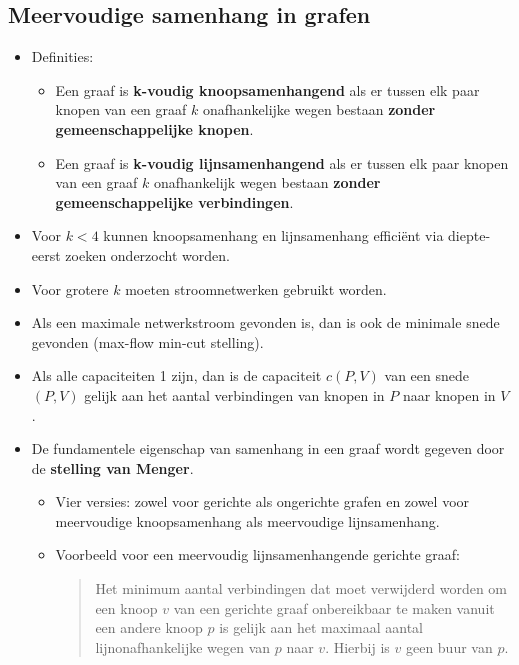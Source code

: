 \subsection{Meervoudige samenhang in grafen}
\begin{itemize}
    \item Definities:
    \begin{itemize}
        \item Een graaf is \textbf{k-voudig knoopsamenhangend} als er tussen elk paar knopen van een graaf $k$ onafhankelijke wegen bestaan \textbf{zonder gemeenschappelijke knopen}.
        \item Een graaf is \textbf{k-voudig lijnsamenhangend} als er tussen elk paar knopen van een graaf $k$ onafhankelijk wegen bestaan \textbf{zonder gemeenschappelijke verbindingen}.
    \end{itemize}
    \item Voor $k < 4$ kunnen knoopsamenhang en lijnsamenhang efficiënt via diepte-eerst zoeken onderzocht worden.
    \item Voor grotere $k$ moeten stroomnetwerken gebruikt worden.
    \item Als een maximale netwerkstroom gevonden is, dan is ook de minimale snede gevonden (max-flow min-cut stelling).
    \item Als alle capaciteiten 1 zijn, dan is de capaciteit $c(P, V)$ van een snede $(P, V)$ gelijk aan het aantal verbindingen van knopen in $P$ naar knopen in $V$.
    \item De fundamentele eigenschap van samenhang in een graaf wordt gegeven door de \textbf{stelling van Menger}.
    \begin{itemize}
        \item Vier versies: zowel voor gerichte als ongerichte grafen en zowel voor meervoudige knoopsamenhang als meervoudige lijnsamenhang.
        \item Voorbeeld voor een meervoudig lijnsamenhangende gerichte graaf:
        
        \begin{quote}
            Het minimum aantal verbindingen dat moet verwijderd worden om een knoop $v$ van een gerichte graaf onbereikbaar te maken vanuit een andere knoop $p$ is gelijk aan het maximaal aantal lijnonafhankelijke wegen van $p$ naar $v$. Hierbij is $v$ geen buur van $p$.
        \end{quote}


\end{itemize}
\end{itemize}
